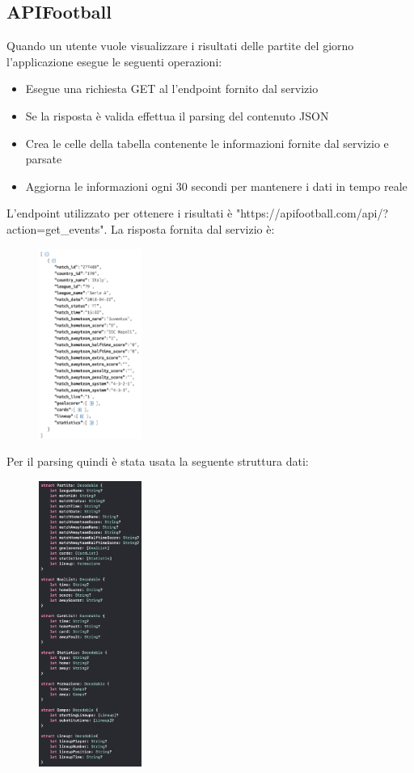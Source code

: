 \documentclass[numbers=noenddot, 12pt, a4paper, oneside]{scrbook}
\begin{document}
\subsection*{APIFootball}
Quando un utente vuole visualizzare i risultati delle partite del giorno l'applicazione esegue le seguenti operazioni:
\begin{itemize}
	\item Esegue una richiesta GET al l'endpoint fornito dal servizio
	\item Se la risposta è valida effettua il parsing del contenuto JSON
	\item Crea le celle della tabella contenente le informazioni fornite dal servizio e parsate
	\item Aggiorna le informazioni ogni 30 secondi per mantenere i dati in tempo reale
\end{itemize}
L'endpoint utilizzato per ottenere i risultati è "https://apifootball.com/api/?action=get\_events". La risposta fornita dal servizio è:
\begin{figure}[H]
	\centering
	\includegraphics[width=0.3\textwidth]{images/ResponseCompleta}
\end{figure}
Per il parsing quindi è stata usata la seguente struttura dati:
\begin{figure}[H]
	\centering
	\includegraphics[width=0.3\textwidth]{images/StructPartita}
\end{figure}
\end{document}
